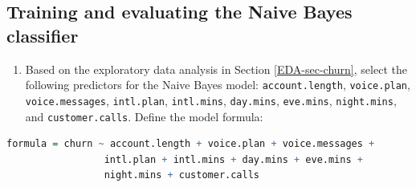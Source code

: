 \documentclass[
  11pt,
]{book}
\newcommand{\passthrough}[1]{#1}
\providecommand{\tightlist}{%
  \setlength{\itemsep}{0pt}\setlength{\parskip}{0pt}}
\theoremstyle{definition}
\theoremstyle{definition}
\theoremstyle{definition}
\theoremstyle{definition}
\theoremstyle{remark}
\begin{document}
\subsection*{Training and evaluating the Naive Bayes classifier}\label{training-and-evaluating-the-naive-bayes-classifier}


\begin{enumerate}
\def\labelenumi{\arabic{enumi}.}
\setcounter{enumi}{20}
\tightlist
\item
  Based on the exploratory data analysis in Section \ref{EDA-sec-churn}, select the following predictors for the Naive Bayes model: \passthrough{\lstinline!account.length!}, \passthrough{\lstinline!voice.plan!}, \passthrough{\lstinline!voice.messages!}, \passthrough{\lstinline!intl.plan!}, \passthrough{\lstinline!intl.mins!}, \passthrough{\lstinline!day.mins!}, \passthrough{\lstinline!eve.mins!}, \passthrough{\lstinline!night.mins!}, and \passthrough{\lstinline!customer.calls!}. Define the model formula:
\end{enumerate}

\begin{lstlisting}[language=R]
formula = churn ~ account.length + voice.plan + voice.messages + 
                 intl.plan + intl.mins + day.mins + eve.mins + 
                 night.mins + customer.calls
\end{lstlisting}
\end{document}
